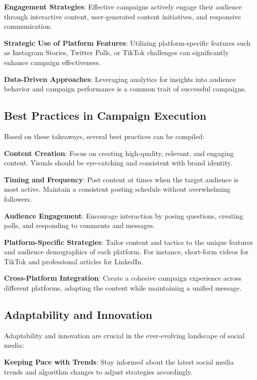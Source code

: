 \documentclass[
]{book}
\begin{document}
\textbf{Engagement Strategies}: Effective campaigns actively engage their audience through interactive content, user-generated content initiatives, and responsive communication.

\textbf{Strategic Use of Platform Features}: Utilizing platform-specific features such as Instagram Stories, Twitter Polls, or TikTok challenges can significantly enhance campaign effectiveness.

\textbf{Data-Driven Approaches}: Leveraging analytics for insights into audience behavior and campaign performance is a common trait of successful campaigns.

\hypertarget{best-practices-in-campaign-execution}{%
\subsection{Best Practices in Campaign Execution}\label{best-practices-in-campaign-execution}}

Based on these takeaways, several best practices can be compiled:

\textbf{Content Creation}: Focus on creating high-quality, relevant, and engaging content. Visuals should be eye-catching and consistent with brand identity.

\textbf{Timing and Frequency}: Post content at times when the target audience is most active. Maintain a consistent posting schedule without overwhelming followers.

\textbf{Audience Engagement}: Encourage interaction by posing questions, creating polls, and responding to comments and messages.

\textbf{Platform-Specific Strategies}: Tailor content and tactics to the unique features and audience demographics of each platform. For instance, short-form videos for TikTok and professional articles for LinkedIn.

\textbf{Cross-Platform Integration}: Create a cohesive campaign experience across different platforms, adapting the content while maintaining a unified message.

\hypertarget{adaptability-and-innovation}{%
\subsection{Adaptability and Innovation}\label{adaptability-and-innovation}}

Adaptability and innovation are crucial in the ever-evolving landscape of social media:

\textbf{Keeping Pace with Trends}: Stay informed about the latest social media trends and algorithm changes to adjust strategies accordingly.
\end{document}
